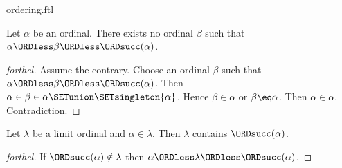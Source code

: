 \documentclass{naproche-library}
\begin{document}
\begin{smodule}[title=The Standard Ordering of the Ordinals]{ordering.ftl}
\begin{proposition}[forthel,id=SET_THEORY_02_4240355610329088]
  Let $\alpha$ be an ordinal.
  There exists no ordinal $\beta$ such that $\alpha \ORDless \beta \ORDless \ORDsucc(\alpha)$.
\end{proposition}
\begin{proof}[forthel]
  Assume the contrary.
  Choose an ordinal $\beta$ such that $\alpha \ORDless \beta \ORDless \ORDsucc(\alpha)$.
  Then $\alpha \in \beta \in \alpha \SETunion \SETsingleton{\alpha}$.
  Hence $\beta \in \alpha$ or $\beta \eq \alpha$.
  Then $\alpha \in \alpha$.
  Contradiction.
\end{proof}

\begin{proposition}[forthel,id=SET_THEORY_02_4659024620421120]
  Let $\lambda$ be a limit ordinal and $\alpha \in \lambda$.
  Then $\lambda$ contains $\ORDsucc(\alpha)$.
\end{proposition}
\begin{proof}[forthel]
  If $\ORDsucc(\alpha) \notin \lambda$ then $\alpha \ORDless \lambda \ORDless \ORDsucc(\alpha)$.
\end{proof}
\end{smodule}
\end{document}
